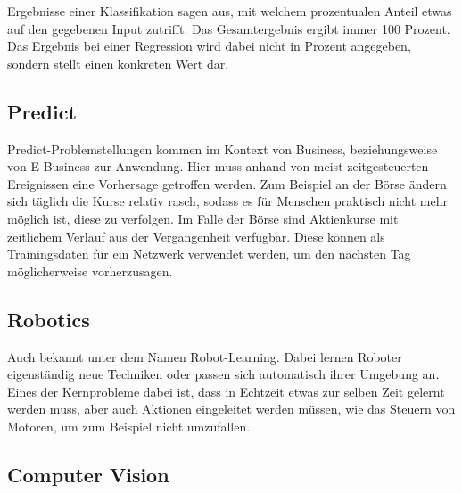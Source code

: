 \noindent
Ergebnisse einer Klassifikation sagen aus, mit welchem prozentualen Anteil etwas auf den gegebenen Input zutrifft. 
Das Gesamtergebnis ergibt immer 100 Prozent. 
Das Ergebnis bei einer Regression wird dabei nicht in Prozent angegeben, sondern stellt einen konkreten Wert dar.

\subsection{Predict}
\label{subsec:Predict}

Predict-Problemstellungen kommen im Kontext von Business, beziehungsweise von E-Business zur Anwendung. 
Hier muss anhand von meist zeitgesteuerten Ereignissen eine Vorhersage getroffen werden. 
Zum Beispiel an der Börse ändern sich täglich die Kurse relativ rasch, sodass es für Menschen praktisch nicht mehr möglich ist, diese zu verfolgen. 
Im Falle der Börse sind Aktienkurse mit zeitlichem Verlauf aus der Vergangenheit verfügbar. 
Diese können als Trainingsdaten für ein Netzwerk verwendet werden, um den nächsten Tag möglicherweise vorherzusagen. 

\subsection{Robotics}
\label{subsec:Robotics}

Auch bekannt unter dem Namen Robot-Learning. 
Dabei lernen Roboter eigenständig neue Techniken oder passen sich automatisch ihrer Umgebung an. 
Eines der Kernprobleme dabei ist, dass in Echtzeit etwas zur selben Zeit gelernt werden muss, aber auch Aktionen eingeleitet werden müssen, wie das Steuern von Motoren, um zum Beispiel nicht umzufallen.

\subsection{Computer Vision}
\label{subsec:Cumputer Vision}


